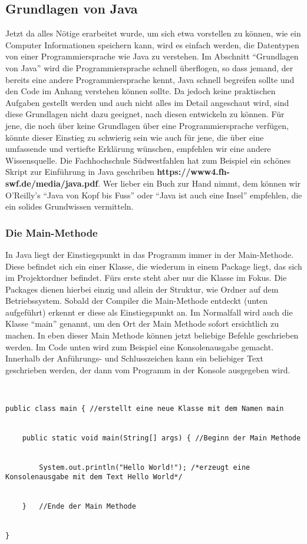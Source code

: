 \subsection{Grundlagen von Java}


Jetzt da alles Nötige erarbeitet wurde, um sich etwa vorstellen zu können, wie ein Computer Informationen speichern kann, wird es einfach werden, die Datentypen von einer Programmiersprache wie Java zu verstehen. Im Abschnitt "`Grundlagen von Java"' wird die Programmiersprache schnell überflogen, so dass jemand, der bereits eine andere Programmiersprache kennt, Java schnell begreifen sollte und den Code im Anhang verstehen können sollte. Da jedoch keine praktischen Aufgaben gestellt werden und auch nicht alles im Detail angeschaut wird, sind diese Grundlagen nicht dazu geeignet, nach diesen entwickeln zu können. Für jene, die noch über keine Grundlagen über eine Programmiersprache verfügen, könnte dieser Einstieg zu schwierig sein wie auch für jene, die über eine umfassende und vertiefte Erklärung wünschen, empfehlen wir eine andere Wissensquelle. Die Fachhochschule Südwestfahlen hat zum Beispiel ein schönes Skript zur Einführung in Java geschriben \textbf{https://www4.fh-swf.de/media/java.pdf}. Wer lieber ein Buch zur Hand nimmt, dem können wir O'Reilly's "`Java von Kopf bis Fuss"' oder 	"`Java ist auch eine Insel"' empfehlen, die ein solides Grundwissen vermitteln.


\subsubsection{Die Main-Methode}


In Java liegt der Einstiegspunkt in das Programm immer in der Main-Methode. Diese befindet sich ein einer Klasse, die wiederum in einem Package liegt,  das sich im Projektordner befindet. Fürs erste steht aber nur die Klasse im Fokus. Die Packages dienen hierbei einzig und allein der Struktur, wie Ordner auf dem Betriebssystem. Sobald der Compiler die Main-Methode entdeckt (unten aufgeführt) erkennt er diese als Einstiegspunkt an. Im Normalfall wird auch die Klasse "`main"' genannt, um den Ort der Main Methode sofort ersichtlich zu machen. In eben dieser Main Methode können jetzt beliebige Befehle geschrieben werden. Im Code unten wird zum Beispiel eine Konsolenausgabe gemacht. Innerhalb der Anführungs- und Schlusszeichen kann ein beliebiger Text geschrieben werden, der dann vom Programm in der Konsole ausgegeben wird.


\begin{lstlisting}


public class main { //erstellt eine neue Klasse mit dem Namen main


	public static void main(String[] args) { //Beginn der Main Methode


		System.out.println("Hello World!"); /*erzeugt eine Konsolenausgabe mit dem Text Hello World*/


	}	//Ende der Main Methode


}


\end{lstlisting}


